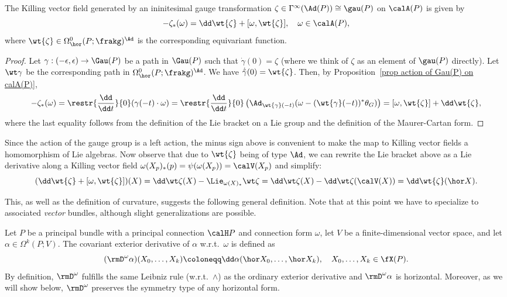 \begin{prop}
    The Killing vector field generated by an ininitesimal gauge transformation $\zeta\in\Gamma^\infty(\Ad(P))\cong\gau(P)$ on $\calA(P)$ is given by
    \[-\zeta_\ast(\omega)=\dd \wt{\zeta}+[\omega,\wt{\zeta}],\quad \omega\in\calA(P),\]
    where $\wt{\zeta}\in \Omega^0_{\hor}(P;\frakg)^\Ad$ is the corresponding equivariant function.
\end{prop}
\begin{proof}
    Let $\gamma:(-\epsilon,\epsilon)\to \Gau(P)$ be a path in $\Gau(P)$ such that $\dot\gamma(0)=\zeta$ (where we think of $\zeta$ as an element of $\gau(P)$ directly). Let $\wt\gamma$ be the corresponding path in $\Omega^0_{\hor}(P;\frakg)^\Ad$. We have $\dot{\tilde{\gamma}}(0)=\wt{\zeta}$. Then, by Proposition~\ref{prop action of Gau(P) on calA(P)},
    \[-\zeta_\ast(\omega)=\restr{\frac{\dd}{\dd t}}{0}(\gamma(-t)\cdot \omega)=\restr{\frac{\dd}{\dd t}}{0}\left(\Ad_{\wt{\gamma}(-t)}(\omega-(\wt{\gamma}(-t))^\ast\theta_G)\right)=[\omega,\wt{\zeta}]+\dd\wt{\zeta},\]
    where the last equality follows from the definition of the Lie bracket on a Lie group and the definition of the Maurer-Cartan form.
\end{proof}


Since the action of the gauge group is a left action, the minus sign above is convenient to make the map to Killing vector fields a homomorphism of Lie algebras. Now observe that due to $\wt{\zeta}$ being of type $\Ad$, we can rewrite the Lie bracket above as a Lie derivative along a Killing vector field $\omega(X_p)_\ast(p)=\psi(\omega(X_p))=\calV(X_p)$ and simplify:
\[(\dd\wt{\zeta}+[\omega,\wt{\zeta}])(X)=
\dd\wt\zeta(X)-\Lie_{\omega(X)_\ast}\wt\zeta=
\dd\wt\zeta(X)-\dd\wt\zeta(\calV(X))=\dd\wt{\zeta}(\hor X).\label{eq 4791793}\]

This, as well as the definition of curvature, suggests the following general definition. Note that at this point we have to specialize to associated \emph{vector} bundles, although slight generalizations are possible.

\begin{defn}
    Let $P$ be a principal bundle with a principal connection $\calH P$ and connection form $\omega$, let $V$ be a finite-dimensional vector space, and let $\alpha\in\Omega^k(P;V)$. The covariant exterior derivative of $\alpha$ w.r.t.\ $\omega$ is defined as
    \[(\rmD^\omega \alpha)(X_0,\ldots,X_k)\coloneqq \dd\alpha(\hor X_0,\ldots,\hor X_k),\quad X_0,\ldots,X_k\in\fX(P).\]
    By definition, $\rmD^\omega$ fulfills the same Leibniz rule (w.r.t.\ $\wedge$) as the ordinary exterior derivative and $\rmD^\omega \alpha$ is horizontal. Moreover, as we will show below, $\rmD^\omega$ preserves the symmetry type of any horizontal form.
\end{defn}

